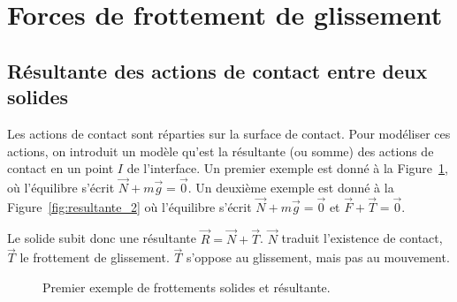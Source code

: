 \section{Forces de frottement de glissement}
    \subsection{Résultante des actions de contact entre deux solides}

        Les actions de contact sont réparties sur la surface de contact. Pour modéliser ces actions, on introduit un modèle qu'est la résultante (ou somme) des actions de contact en un point $I$ de l'interface. Un premier exemple est donné à la Figure~\ref{fig:resultante_1}, où l'équilibre s'écrit $\vec{N}+m\vec{g}=\vec{0}$. Un deuxième exemple est donné à la Figure~\ref{fig:resultante_2} où l'équilibre s'écrit $\vec{N}+m\vec{g}=\vec{0}$ et $\vec{F}+\vec{T}=\vec{0}$.

        Le solide subit donc une résultante $\vec{R}=\vec{N}+\vec{T}$. $\vec{N}$ traduit l'existence de contact, $\vec{T}$ le frottement de glissement. $\vec{T}$ s'oppose au glissement, mais pas au mouvement.

        \begin{figure}
            \centering
            \caption{Premier exemple de frottements solides et résultante.}    
            \label{fig:resultante_1}
        \end{figure}

